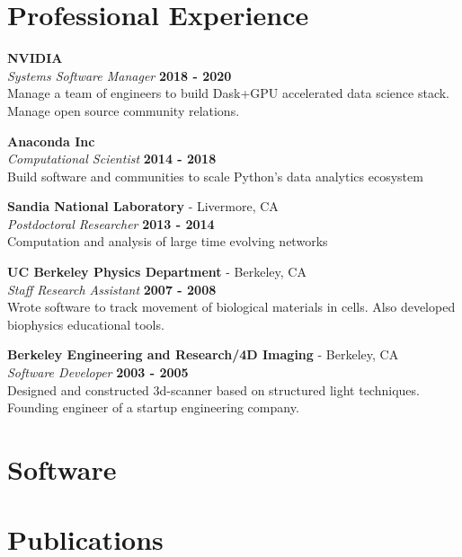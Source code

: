 \documentclass[margin,line]{res}
\begin{document}
\begin{resume}
\section{\sc Professional Experience}

{\bf NVIDIA} \\
{\em Systems Software Manager} \hfill {\bf 2018 - 2020}\\
Manage a team of engineers to build Dask+GPU accelerated data science stack.
Manage open source community relations.

{\bf Anaconda Inc} \\
{\em Computational Scientist} \hfill {\bf 2014 - 2018}\\
Build software and communities to scale Python's data analytics ecosystem

{\bf Sandia National Laboratory } - Livermore, CA\\
{\em Postdoctoral Researcher} \hfill {\bf 2013 - 2014}\\
Computation and analysis of large time evolving networks

{\bf UC Berkeley Physics Department} - Berkeley, CA\\
{\em Staff Research Assistant} \hfill {\bf 2007 - 2008}\\
Wrote software to track movement of biological materials in cells.
Also developed biophysics educational tools.

{\bf Berkeley Engineering and Research/4D Imaging} - Berkeley, CA\\
{\em Software Developer} \hfill {\bf 2003 - 2005}\\
Designed and constructed 3d-scanner based on structured light techniques.
Founding engineer of a startup engineering company.

\section{\sc Software}




\section{\sc Publications}




\end{resume}
\end{document}
